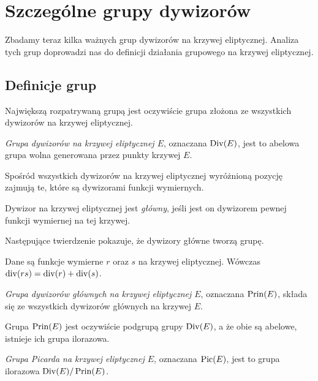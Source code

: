 \section{Szczególne grupy dywizorów}

Zbadamy teraz kilka ważnych grup dywizorów na krzywej eliptycznej.
Analiza tych grup doprowadzi nas do definicji
działania grupowego na krzywej eliptycznej.

\subsection*{Definicje grup}

Największą rozpatrywaną grupą jest oczywiście
grupa złożona ze wszystkich dywizorów na krzywej eliptycznej.

\begin{definition}
\emph{Grupa dywizorów na krzywej eliptycznej $E$},
oznaczana $\operatorname{Div}(E)$,
jest to abelowa grupa wolna generowana przez punkty krzywej $E$.
\end{definition}

Spośród wszystkich dywizorów na krzywej eliptycznej
wyróżnioną pozycję zajmują te,
które są dywizorami funkcji wymiernych.

\begin{definition}
Dywizor na krzywej eliptycznej jest \emph{główny},
jeśli jest on dywizorem pewnej funkcji wymiernej na tej krzywej.
\end{definition}

Następujące twierdzenie pokazuje, że dywizory główne tworzą grupę.

\begin{theorem}\label{fun_mul_divi_add_theorem}
Dane są funkcje wymierne $r$ oraz $s$ na krzywej eliptycznej.
Wówczas $\operatorname{div}(rs) = \operatorname{div}(r) + \operatorname{div}(s)$.
\end{theorem}

\begin{definition}
\emph{Grupa dywizorów głównych na krzywej eliptycznej $E$},
oznaczana $\operatorname{Prin}(E)$,
składa się ze wszystkich dywizorów głównych na krzywej $E$.
\end{definition}

Grupa $\operatorname{Prin}(E)$ jest oczywiście podgrupą grupy $\operatorname{Div}(E)$,
a że obie są abelowe, istnieje ich grupa ilorazowa.

\begin{definition}
\emph{Grupa Picarda na krzywej eliptycznej $E$},
oznaczana $\operatorname{Pic}(E)$,
jest to grupa ilorazowa $\operatorname{Div}(E)/\operatorname{Prin}(E)$.
\end{definition}

